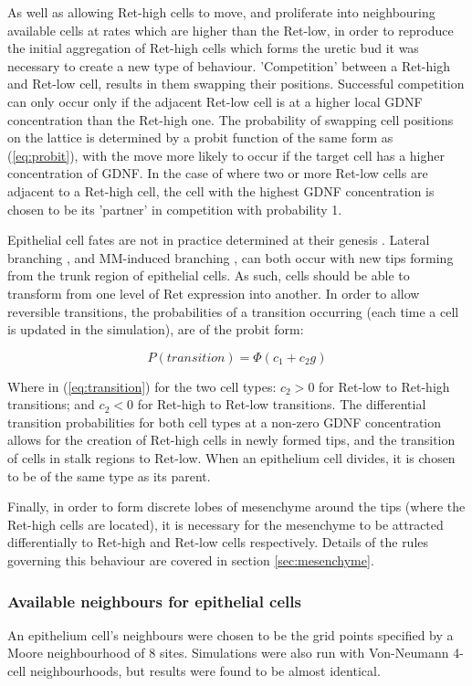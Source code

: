 \documentclass[pdftex,10pt,a4paper,twocolumn]{article}
\begin{document}
As well as allowing Ret-high cells to move, and proliferate into neighbouring available cells at rates which are higher than the Ret-low, in order to reproduce the initial aggregation of Ret-high cells which forms the uretic bud it was necessary to create a new type of behaviour. 'Competition' between a Ret-high and Ret-low cell, results in them swapping their positions. Successful competition can only occur only if the adjacent Ret-low cell is at a higher local GDNF concentration than the Ret-high one. The probability of swapping cell positions on the lattice is determined by a probit function of the same form as (\ref{eq:probit}), with the move more likely to occur if the target cell has a higher concentration of GDNF. In the case of where two or more Ret-low cells are adjacent to a Ret-high cell, the cell with the highest GDNF concentration is chosen to be its 'partner' in competition with probability 1.

Epithelial cell fates are not in practice determined at their genesis \cite{CostantiniFKopan2010}. Lateral branching \cite{watanabe2004real}, and MM-induced branching \cite{sweeney2008developmental}, can both occur with new tips forming from the trunk region of epithelial cells. As such, cells should be able to transform from one level of Ret expression into another. In order to allow reversible transitions, the probabilities of a transition occurring (each time a cell is updated in the simulation), are of the probit form:

\begin{equation}\label{eq:transition}
P(transition) = \Phi (c_1 + c_2 g)
\end{equation}

Where in (\ref{eq:transition}) for the two cell types: $c_2>0$ for Ret-low to Ret-high transitions; and $c_2<0$ for Ret-high to Ret-low transitions. The differential transition probabilities for both cell types at a non-zero GDNF concentration allows for the creation of Ret-high cells in newly formed tips, and the transition of cells in stalk regions to Ret-low. When an epithelium cell divides, it is chosen to be of the same type as its parent.

Finally, in order to form discrete lobes of mesenchyme around the tips (where the Ret-high cells are located), it is necessary for the mesenchyme to be attracted differentially to Ret-high and Ret-low cells respectively. Details of the rules governing this behaviour are covered in section \ref{sec:mesenchyme}.

\subsubsection{Available neighbours for epithelial cells}\label{sec:available}
An epithelium cell's neighbours were chosen to be the grid points specified by a Moore neighbourhood of 8 sites. Simulations were also run with Von-Neumann 4-cell neighbourhoods, but results were found to be almost identical.
\end{document}

